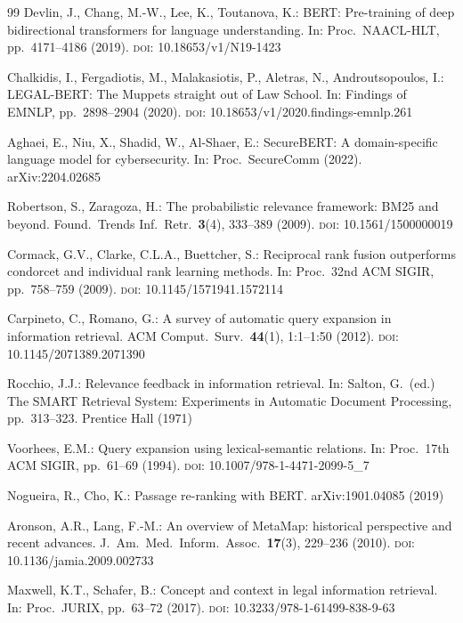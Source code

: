 \documentclass{sn-jnl}
\begin{document}
\begin{thebibliography}{99}
Devlin, J., Chang, M.-W., Lee, K., Toutanova, K.: BERT: Pre-training of deep bidirectional transformers for language understanding. In: Proc.\ NAACL-HLT, pp.\ 4171--4186 (2019). \textsc{doi}: 10.18653/v1/N19-1423

Chalkidis, I., Fergadiotis, M., Malakasiotis, P., Aletras, N., Androutsopoulos, I.: LEGAL-BERT: The Muppets straight out of Law School. In: Findings of EMNLP, pp.\ 2898--2904 (2020). \textsc{doi}: 10.18653/v1/2020.findings-emnlp.261

Aghaei, E., Niu, X., Shadid, W., Al-Shaer, E.: SecureBERT: A domain-specific language model for cybersecurity. In: Proc.\ SecureComm (2022). arXiv:2204.02685

Robertson, S., Zaragoza, H.: The probabilistic relevance framework: BM25 and beyond. Found.\ Trends Inf.\ Retr.\ \textbf{3}(4), 333--389 (2009). \textsc{doi}: 10.1561/1500000019

Cormack, G.V., Clarke, C.L.A., Buettcher, S.: Reciprocal rank fusion outperforms condorcet and individual rank learning methods. In: Proc.\ 32nd ACM SIGIR, pp.\ 758--759 (2009). \textsc{doi}: 10.1145/1571941.1572114

Carpineto, C., Romano, G.: A survey of automatic query expansion in information retrieval. ACM Comput.\ Surv.\ \textbf{44}(1), 1:1--1:50 (2012). \textsc{doi}: 10.1145/2071389.2071390

Rocchio, J.J.: Relevance feedback in information retrieval. In: Salton, G.\ (ed.) The SMART Retrieval System: Experiments in Automatic Document Processing, pp.\ 313--323. Prentice Hall (1971)

Voorhees, E.M.: Query expansion using lexical-semantic relations. In: Proc.\ 17th ACM SIGIR, pp.\ 61--69 (1994). \textsc{doi}: 10.1007/978-1-4471-2099-5\_7

Nogueira, R., Cho, K.: Passage re-ranking with BERT. arXiv:1901.04085 (2019)

Aronson, A.R., Lang, F.-M.: An overview of MetaMap: historical perspective and recent advances. J.\ Am.\ Med.\ Inform.\ Assoc.\ \textbf{17}(3), 229--236 (2010). \textsc{doi}: 10.1136/jamia.2009.002733

Maxwell, K.T., Schafer, B.: Concept and context in legal information retrieval. In: Proc.\ JURIX, pp.\ 63--72 (2017). \textsc{doi}: 10.3233/978-1-61499-838-9-63


\end{thebibliography}
\end{document}
